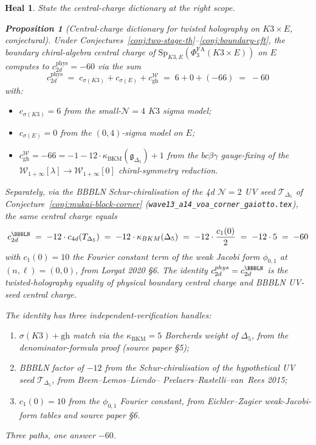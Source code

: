\documentclass[11pt]{article}
\newtheorem{proposition}[theorem]{Proposition}
\newtheorem*{heal}{Heal}
\providecommand{\cN}{\mathcal{N}}
\providecommand{\cT}{\mathcal{T}}
\providecommand{\cW}{\mathcal{W}}
\providecommand{\fg}{\mathfrak{g}}
\providecommand{\Sp}{\mathrm{Sp}}
\providecommand{\BKM}{\mathrm{BKM}}
\begin{document}
\begin{heal}
State the central-charge dictionary at the right scope.
\begin{proposition}[Central-charge dictionary for twisted holography
  on $K3\times E$, conjectural]
\label{prop:c-dictionary}
Under Conjectures~\ref{conj:two-stage-th}--\ref{conj:boundary-cft},
the boundary chiral-algebra central charge of
$\Sp_{K3,E}(\Phi^{\mathrm{FA}}_3(K3\times E))$ on $E$ computes to
$c_{2d}^{\mathrm{phys}} = -60$ via the sum
\[
  c_{2d}^{\mathrm{phys}}
  \;=\;
  c_{\sigma(K3)} + c_{\sigma(E)} + c_{\mathrm{gh}}^{\cW}
  \;=\;
  6 + 0 + (-66)
  \;=\;
  -60
\]
with:
\begin{itemize}[leftmargin=1.5em]
\item $c_{\sigma(K3)} = 6$ from the small-$\cN{=}4$ $K3$ sigma model;
\item $c_{\sigma(E)} = 0$ from the $(0,4)$-sigma model on $E$;
\item $c_{\mathrm{gh}}^{\cW} = -66 = -1 - 12\cdot\kappa_{\BKM}(\fg_{\Delta_5})
+ 1$ from the $bc\beta\gamma$ gauge-fixing of the
$\cW_{1+\infty}[\lambda]\to\cW_{1+\infty}[0]$ chiral-symmetry reduction.
\end{itemize}
Separately, via the BBBLN Schur-chiralisation of the 4d $\cN{=}2$ UV seed
$\cT_{\Delta_5}$ of Conjecture~\ref{conj:mukai-block-corner}
(\texttt{wave13\_a14\_voa\_corner\_gaiotto.tex}), the same central
charge equals
\[
  c_{2d}^{\BBBLN}
  \;=\;
  -12\cdot c_{4d}(\cT_{\Delta_5})
  \;=\;
  -12\cdot\kappa_{\BKM}(\Delta_5)
  \;=\;
  -12\cdot\frac{c_1(0)}{2}
  \;=\;
  -12\cdot 5
  \;=\;
  -60
\]
with $c_1(0) = 10$ the Fourier constant term of the weak Jacobi form
$\phi_{0,1}$ at $(n,\ell) = (0,0)$, from Lorgat 2020 \S6. The identity
$c_{2d}^{\mathrm{phys}} = c_{2d}^{\BBBLN}$ is the twisted-holography
equality of physical boundary central charge and BBBLN UV-seed central
charge.
\end{proposition}

The identity has three independent-verification handles:
\begin{enumerate}[leftmargin=1.5em,label=(\roman*)]
\item $\sigma(K3) + \mathrm{gh}$ match via the $\kappa_{\BKM} = 5$
Borcherds weight of $\Delta_5$, from the denominator-formula proof
(source paper \S5);
\item BBBLN factor of $-12$ from the Schur-chiralisation of the
hypothetical UV seed $\cT_{\Delta_5}$, from Beem--Lemos--Liendo--
Peelaers--Rastelli--van~Rees 2015;
\item $c_1(0) = 10$ from the $\phi_{0,1}$ Fourier constant, from
Eichler--Zagier weak-Jacobi-form tables and source paper \S6.
\end{enumerate}
Three paths, one answer $-60$.
\end{heal}
\end{document}
